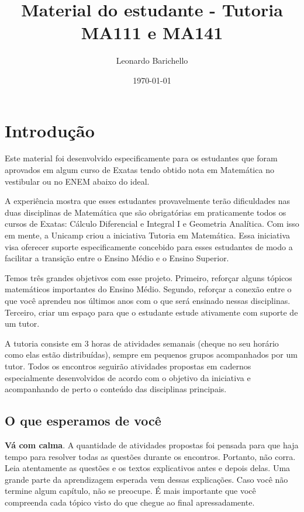 \documentclass[10pt,openany]{book}
\title{Material do estudante - Tutoria MA111 e MA141}
\author{Leonardo Barichello}
\date{\today}
\begin{document}
\maketitle

\chapter{Introdução}

Este material foi desenvolvido especificamente para os estudantes que foram aprovados em algum curso de Exatas tendo obtido nota em Matemática no vestibular ou no ENEM abaixo do ideal.

A experiência mostra que esses estudantes provavelmente terão dificuldades nas duas disciplinas de Matemática que são obrigatórias em praticamente todos os cursos de Exatas: Cálculo Diferencial e Integral I e Geometria Analítica. Com isso em mente, a Unicamp criou a iniciativa Tutoria em Matemática. Essa iniciativa visa oferecer suporte especificamente concebido para esses estudantes de modo a facilitar a transição entre o Ensino Médio e o Ensino Superior.

Temos três grandes objetivos com esse projeto. Primeiro, reforçar alguns tópicos matemáticos importantes do Ensino Médio. Segundo, reforçar a conexão entre o que você aprendeu nos últimos anos com o que será ensinado nessas disciplinas. Terceiro, criar um espaço para que o estudante estude ativamente com suporte de um tutor.

A tutoria consiste em 3 horas de atividades semanais (cheque no seu horário como elas estão distribuídas), sempre em pequenos grupos acompanhados por um tutor. Todos os encontros seguirão atividades propostas em cadernos especialmente desenvolvidos de acordo com o objetivo da iniciativa e acompanhando de perto o conteúdo das disciplinas principais.

\section{O que esperamos de você}

\textbf{Vá com calma}. A quantidade de atividades propostas foi pensada para que haja tempo para resolver todas as questões durante os encontros. Portanto, não corra. Leia atentamente as questões e os textos explicativos antes e depois delas. Uma grande parte da aprendizagem esperada vem dessas explicações. Caso você não termine algum capítulo, não se preocupe. É mais importante que você compreenda cada tópico visto do que chegue ao final apressadamente.
 
\end{document}

